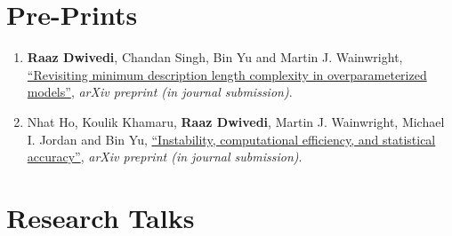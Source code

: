\documentclass[margin,centered]{res}
\newcommand\quelle[1]{{%
      \unskip\nobreak\hfil\penalty50
      \hskip2em\hbox{}\nobreak\hfil\emph{#1}%
      \parfillskip=0pt \finalhyphendemerits=0 \par}}
\newcommand{\ptitle}[1]{``#1''}
\begin{document}
\begin{resume}
\section{\sc Pre-Prints} 

\begin{enumerate}[label={P\arabic*.},leftmargin=*]
\item \textbf{Raaz Dwivedi}\eqc, {Chandan Singh}\eqc, Bin Yu and Martin
J. Wainwright, \href{https://arxiv.org/abs/2006.10189}{\ptitle{Revisiting minimum description length complexity in overparameterized models}}, \textit{arXiv preprint (in journal submission)}.
\item Nhat Ho\eqc, Koulik Khamaru\eqc, \textbf{Raaz Dwivedi}\eqc, Martin
J. Wainwright, Michael I. Jordan and Bin Yu,  \href{https://arxiv.org/abs/2005.11411}
{\ptitle{Instability, computational efficiency,
and statistical accuracy}}, \textit{arXiv preprint (in journal submission)}.
\end{enumerate}








\section{\sc Research Talks}

\end{resume}
\end{document}
